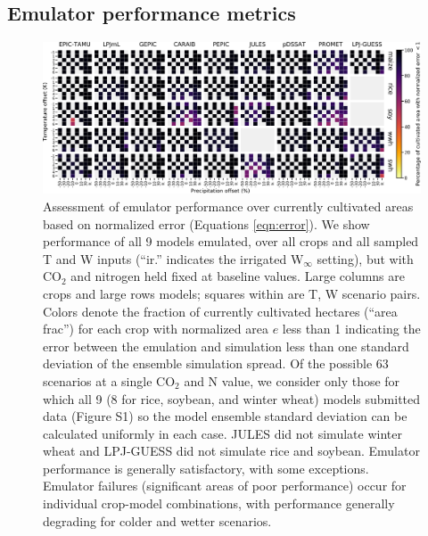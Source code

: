\documentclass[gmdd]{copernicus} %
\begin{document}
\subsection{Emulator performance metrics}
\label{S:4.2}

\begin{figure}[ht]
    \centering
        \includegraphics[width=16.3cm]{figures/error_grid_new.png}
        \caption{
        Assessment of emulator performance over currently cultivated areas based on normalized error (Equations \ref{eqn:error}). 
        We show performance of all 9 models emulated, over all crops and all sampled T and W inputs (``ir.'' indicates the irrigated W$_{\infty}$ setting), but with CO$_2$ and nitrogen held fixed at baseline values. 
        Large columns are crops and large rows models; squares within are T, W scenario pairs. 
        Colors denote the fraction of currently cultivated hectares (``area frac'') for each crop with normalized area $e$ less than 1 indicating the error between the emulation and simulation less than one standard deviation of the ensemble simulation spread. 
        Of the possible 63 scenarios at a single CO$_2$ and N value, we consider only those for which all 9 (8 for rice, soybean, and winter wheat) models submitted data (Figure S1) so the model ensemble standard deviation can be calculated uniformly in each case. 
        JULES did not simulate winter wheat and LPJ-GUESS did not simulate rice and soybean. Emulator performance is generally satisfactory, with some exceptions. 
        Emulator failures (significant areas of poor performance) occur for individual crop-model combinations, with performance generally degrading for colder and wetter scenarios.
        }
       \label{fig:error_360}
    \end{figure}
    
\end{document}
